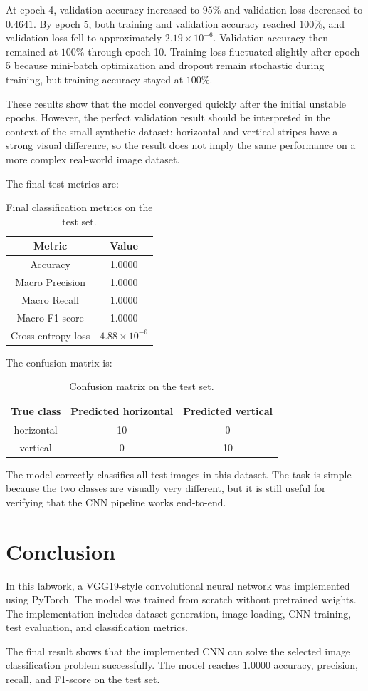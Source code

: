 \documentclass[12pt,a4paper]{article}
\begin{document}
At epoch 4, validation accuracy increased to \(95\%\) and validation loss decreased to \(0.4641\).
By epoch 5, both training and validation accuracy reached \(100\%\), and validation loss fell to approximately \(2.19 \times 10^{-6}\).
Validation accuracy then remained at \(100\%\) through epoch 10.
Training loss fluctuated slightly after epoch 5 because mini-batch optimization and dropout remain stochastic during training, but training accuracy stayed at \(100\%\).

These results show that the model converged quickly after the initial unstable epochs.
However, the perfect validation result should be interpreted in the context of the small synthetic dataset: horizontal and vertical stripes have a strong visual difference, so the result does not imply the same performance on a more complex real-world image dataset.

The final test metrics are:

\begin{table}[H]
\centering
\begin{tabular}{cc}
\toprule
Metric & Value \\
\midrule
Accuracy & 1.0000 \\
Macro Precision & 1.0000 \\
Macro Recall & 1.0000 \\
Macro F1-score & 1.0000 \\
Cross-entropy loss & \(4.88 \times 10^{-6}\) \\
\bottomrule
\end{tabular}
\caption{Final classification metrics on the test set.}
\end{table}

The confusion matrix is:

\begin{table}[H]
\centering
\begin{tabular}{ccc}
\toprule
True class & Predicted horizontal & Predicted vertical \\
\midrule
horizontal & 10 & 0 \\
vertical & 0 & 10 \\
\bottomrule
\end{tabular}
\caption{Confusion matrix on the test set.}
\end{table}

The model correctly classifies all test images in this dataset.
The task is simple because the two classes are visually very different, but it is still useful for verifying that the CNN pipeline works end-to-end.

\section{Conclusion}

In this labwork, a VGG19-style convolutional neural network was implemented using PyTorch.
The model was trained from scratch without pretrained weights.
The implementation includes dataset generation, image loading, CNN training, test evaluation, and classification metrics.

The final result shows that the implemented CNN can solve the selected image classification problem successfully.
The model reaches \(1.0000\) accuracy, precision, recall, and F1-score on the test set.
\end{document}
